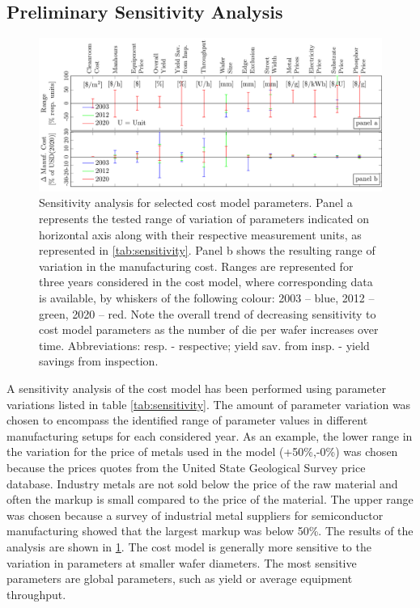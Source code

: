 \documentclass[10pt]{article}
\begin{document}
\newpage
\subsection{Preliminary Sensitivity Analysis}

\begin{figure}[]
	\centering
    \includegraphics[width=\textwidth]{2_SSL_EES/article/figures/costmodel_sensitivity.pdf}
	\caption{Sensitivity analysis for selected cost model parameters. Panel a represents the tested range of variation of parameters indicated on horizontal axis along with their respective measurement units, as represented in \cref{tab:sensitivity}. Panel b shows the resulting range of variation in the manufacturing cost. Ranges are represented for three years considered in the cost model, where corresponding data is available, by whiskers of the following colour: 2003 – blue, 2012 – green, 2020 – red. Note the overall trend of decreasing sensitivity to cost model parameters as the number of die per wafer increases over time. Abbreviations: resp. - respective; yield sav. from insp. - yield savings from inspection.}
	\label{fig:sensitivity}
\end{figure}

A sensitivity analysis of the cost model has been performed using parameter variations listed in table \cref{tab:sensitivity}. The amount of parameter variation was chosen to encompass the identified range of parameter values in different manufacturing setups for each considered year. As an example, the lower range in the variation for the price of metals used in the model (+50\%,-0\%) was chosen because the prices quotes from the United State Geological Survey price database. Industry metals are not sold below the price of the raw material and often the markup is small compared to the price of the material. The upper range was chosen because a survey of industrial metal suppliers for semiconductor manufacturing showed that the largest markup was below 50\%. The results of the analysis are shown in  \cref{fig:sensitivity}. The cost model is generally more sensitive to the variation in parameters at smaller wafer diameters. The most sensitive parameters are global parameters, such as yield or average equipment throughput.
\end{document}
